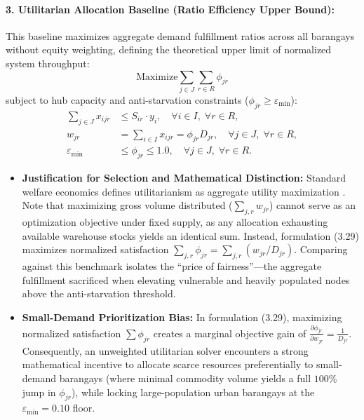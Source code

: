 \paragraph{3. Utilitarian Allocation Baseline (Ratio Efficiency Upper Bound):} 
This baseline maximizes aggregate demand fulfillment ratios across all barangays without equity weighting, defining the theoretical upper limit of normalized system throughput:
\begin{equation}
    \text{Maximize} \sum_{j \in J} \sum_{r \in R} \phi_{jr}
\end{equation}
subject to hub capacity and anti-starvation constraints ($\phi_{jr} \ge \varepsilon_{\min}$):
\begin{align}
    \sum_{j \in J} x_{ijr} &\le S_{ir} \cdot y_i, \quad \forall i \in I, \; \forall r \in R, \\
    w_{jr} &= \sum_{i \in I} x_{ijr} = \phi_{jr} D_{jr}, \quad \forall j \in J, \; \forall r \in R, \\
    \varepsilon_{\min} &\le \phi_{jr} \le 1.0, \quad \forall j \in J, \; \forall r \in R.
\end{align}
\begin{itemize}
    \item \textbf{Justification for Selection and Mathematical Distinction:} Standard welfare economics defines utilitarianism as aggregate utility maximization \citep{vitoriano2011, gutjahr2018}. Note that maximizing gross volume distributed ($\sum_{j,r} w_{jr}$) cannot serve as an optimization objective under fixed supply, as any allocation exhausting available warehouse stocks yields an identical sum. Instead, formulation (3.29) maximizes normalized satisfaction $\sum_{j,r} \phi_{jr} = \sum_{j,r} (w_{jr} / D_{jr})$. Comparing against this benchmark isolates the ``price of fairness''---the aggregate fulfillment sacrificed when elevating vulnerable and heavily populated nodes above the anti-starvation threshold.
    \item \textbf{Small-Demand Prioritization Bias:} In formulation (3.29), maximizing normalized satisfaction $\sum \phi_{jr}$ creates a marginal objective gain of $\frac{\partial \phi_{jr}}{\partial w_{jr}} = \frac{1}{D_{jr}}$. Consequently, an unweighted utilitarian solver encounters a strong mathematical incentive to allocate scarce resources preferentially to small-demand barangays (where minimal commodity volume yields a full $100\%$ jump in $\phi_{jr}$), while locking large-population urban barangays at the $\varepsilon_{\min} = 0.10$ floor.
\end{itemize}

